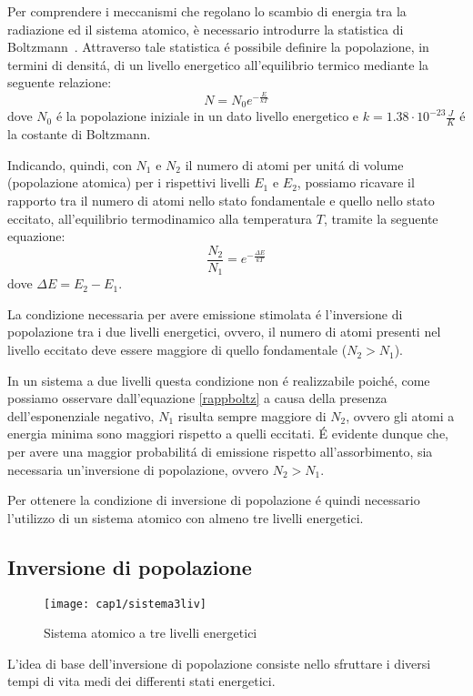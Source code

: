 Per comprendere i meccanismi che regolano lo scambio di energia tra la radiazione ed il sistema atomico, è necessario introdurre la statistica di Boltzmann~\cite{kasap2012optoelectronics}. Attraverso tale statistica \'e possibile definire la popolazione, in termini di densit\'a, di un livello energetico all'equilibrio termico mediante la seguente relazione:
\begin{equation}
  N=N_0e^{{-\frac{E}{kT}}}
\end{equation}
dove $N_0$ \'e la popolazione iniziale in un dato livello energetico e $k=1.38\cdot10^{-23}\frac{J}{K}$ \'e la costante di Boltzmann.
 
 Indicando, quindi, con $N_1$ e $N_2$ il numero di atomi per unit\'a di volume (popolazione atomica) per i rispettivi livelli $E_1$ e $E_2$, possiamo ricavare il rapporto tra il numero di atomi nello stato fondamentale e quello nello stato eccitato, all'equilibrio termodinamico alla temperatura $T$, tramite la seguente equazione:
\begin{equation}
	\frac{N_2}{N_1}=e^{-\frac{\Delta E}{kT}} 
	\label{rappboltz}
\end{equation}
dove $\Delta E = E_2 - E_1$.

La condizione necessaria per avere emissione stimolata \'e l'inversione di popolazione tra i due livelli energetici, ovvero, il numero di atomi presenti nel livello eccitato deve essere maggiore di quello fondamentale ($N_2 > N_1$).

In un sistema a due livelli questa condizione non \'e realizzabile poich\'e, come possiamo osservare dall'equazione \ref{rappboltz} a causa della presenza dell'esponenziale negativo, $N_1$ risulta sempre maggiore di $N_2$, ovvero gli atomi a energia minima sono maggiori rispetto a quelli eccitati. 
\'E evidente dunque che, per avere una maggior probabilit\'a di emissione rispetto all'assorbimento, sia necessaria un'inversione di popolazione, ovvero $N_2 > N_1$.

Per ottenere la condizione di inversione di popolazione \'e quindi necessario l'utilizzo di un sistema atomico con almeno tre livelli energetici.

\subsection{Inversione di popolazione}
\begin{figure}[H]
  \begin{center}
    \texttt{[image: cap1/sistema3liv]}
    \caption{Sistema atomico a tre livelli energetici}
    \label{sistema3liv}
  \end{center}
\end{figure}
L'idea di base dell'inversione di popolazione consiste nello sfruttare i diversi tempi di vita medi dei differenti stati energetici.

